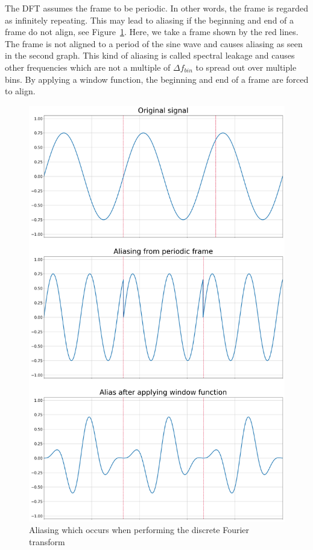 \documentclass[10pt,twocolumn]{article}
\begin{document}
The DFT assumes the frame to be periodic. In other words, the frame is regarded as infinitely repeating. This may lead to aliasing if the beginning and end of a frame do not align, see Figure~\ref{fig:framealias}. Here, we take a frame shown by the red lines. The frame is not aligned to a period of the sine wave and causes aliasing as seen in the second graph. This kind of aliasing is called spectral leakage and causes other frequencies which are not a multiple of $\Delta f_{bin}$ to spread out over multiple bins. By applying a window function, the beginning and end of a frame are forced to align.
\begin{figure}[H]
    \centering
    \includegraphics[width=\linewidth]{fig/leakage.png}
    \caption{Aliasing which occurs when performing the discrete Fourier transform}
    \label{fig:framealias}
\end{figure}
\end{document}
